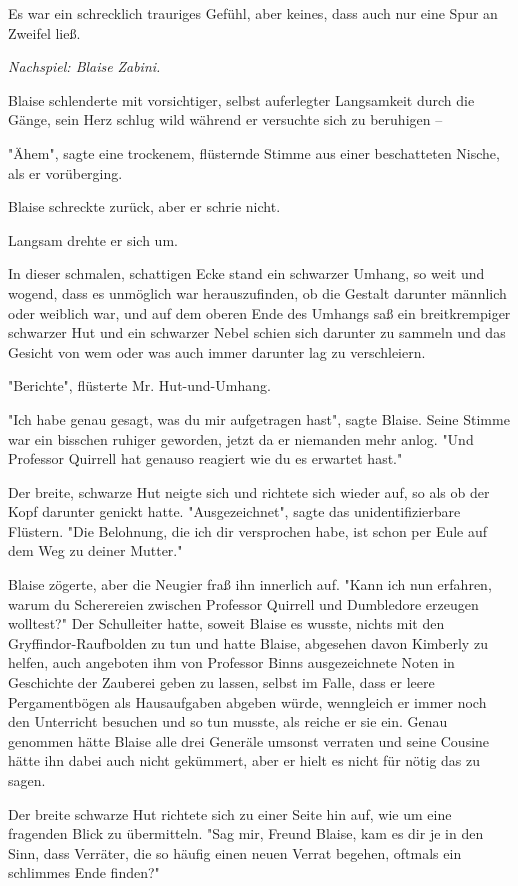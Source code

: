{Es war ein schrecklich trauriges Gefühl, aber keines, dass auch nur eine Spur an Zweifel ließ.

\emph{Nachspiel: Blaise} \emph{Zabini.}

Blaise schlenderte mit vorsichtiger, selbst auferlegter Langsamkeit durch die Gänge, sein Herz schlug wild während er versuchte sich zu beruhigen --

"Ähem", sagte eine trockenem, flüsternde Stimme aus einer beschatteten Nische, als er vorüberging.

Blaise schreckte zurück, aber er schrie nicht.

Langsam drehte er sich um.

In dieser schmalen, schattigen Ecke stand ein schwarzer Umhang, so weit und wogend, dass es unmöglich war herauszufinden, ob die Gestalt darunter männlich oder weiblich war, und auf dem oberen Ende des Umhangs saß ein breitkrempiger schwarzer Hut und ein schwarzer Nebel schien sich darunter zu sammeln und das Gesicht von wem oder was auch immer darunter lag zu verschleiern.

"Berichte", flüsterte Mr. Hut-und-Umhang.

"Ich habe genau gesagt, was du mir aufgetragen hast", sagte Blaise. Seine Stimme war ein bisschen ruhiger geworden, jetzt da er niemanden mehr anlog. "Und Professor Quirrell hat genauso reagiert wie du es erwartet hast."

Der breite, schwarze Hut neigte sich und richtete sich wieder auf, so als ob der Kopf darunter genickt hatte. "Ausgezeichnet", sagte das unidentifizierbare Flüstern. "Die Belohnung, die ich dir versprochen habe, ist schon per Eule auf dem Weg zu deiner Mutter."

Blaise zögerte, aber die Neugier fraß ihn innerlich auf. "Kann ich nun erfahren, warum du Scherereien zwischen Professor Quirrell und Dumbledore erzeugen wolltest?" Der Schulleiter hatte, soweit Blaise es wusste, nichts mit den Gryffindor-Raufbolden zu tun und hatte Blaise, abgesehen davon Kimberly zu helfen, auch angeboten ihm von Professor Binns ausgezeichnete Noten in Geschichte der Zauberei geben zu lassen, selbst im Falle, dass er leere Pergamentbögen als Hausaufgaben abgeben würde, wenngleich er immer noch den Unterricht besuchen und so tun musste, als reiche er sie ein. Genau genommen hätte Blaise alle drei Generäle umsonst verraten und seine Cousine hätte ihn dabei auch nicht gekümmert, aber er hielt es nicht für nötig das zu sagen.

Der breite schwarze Hut richtete sich zu einer Seite hin auf, wie um eine fragenden Blick zu übermitteln. "Sag mir, Freund Blaise, kam es dir je in den Sinn, dass Verräter, die so häufig einen neuen Verrat begehen, oftmals ein schlimmes Ende finden?"

}
